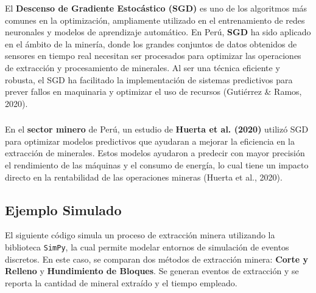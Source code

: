 \documentclass{article}
\begin{document}
El \textbf{Descenso de Gradiente Estocástico (SGD)} es uno de los algoritmos más comunes en la optimización, ampliamente utilizado en el entrenamiento de redes neuronales y modelos de aprendizaje automático. En Perú, \textbf{SGD} ha sido aplicado en el ámbito de la minería, donde los grandes conjuntos de datos obtenidos de sensores en tiempo real necesitan ser procesados para optimizar las operaciones de extracción y procesamiento de minerales. Al ser una técnica eficiente y robusta, el SGD ha facilitado la implementación de sistemas predictivos para prever fallos en maquinaria y optimizar el uso de recursos (Gutiérrez \& Ramos, 2020).

\subsubsection*{}
En el \textbf{sector minero} de Perú, un estudio de \textbf{Huerta et al. (2020)} utilizó SGD para optimizar modelos predictivos que ayudaran a mejorar la eficiencia en la extracción de minerales. Estos modelos ayudaron a predecir con mayor precisión el rendimiento de las máquinas y el consumo de energía, lo cual tiene un impacto directo en la rentabilidad de las operaciones mineras (Huerta et al., 2020).


\subsection*{Ejemplo Simulado}

El siguiente código simula un proceso de extracción minera utilizando la biblioteca \texttt{SimPy}, la cual permite modelar entornos de simulación de eventos discretos. En este caso, se comparan dos métodos de extracción minera: \textbf{Corte y Relleno} y \textbf{Hundimiento de Bloques}. Se generan eventos de extracción y se reporta la cantidad de mineral extraído y el tiempo empleado.
\end{document}
